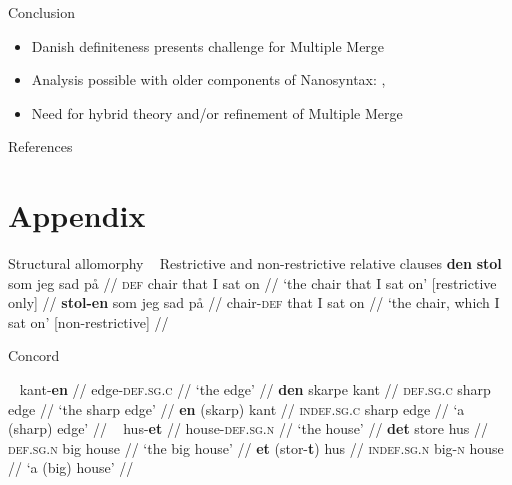 \documentclass[aspectratio=149]{beamer}
\begin{document}
\begin{frame}{Conclusion}
\begin{itemize}
\item Danish definiteness presents challenge for Multiple Merge
\item Analysis possible with older components of Nanosyntax: \citet{taraldsen2010nanosyntax}, \citet{starke2018complex}
\item Need for hybrid theory and/or refinement of Multiple Merge
\end{itemize}
\end{frame}

\begin{frame}{References}
\nocite{caha2019fine}
\nocite{hankamer2018structure}
\printbibliography[heading=none]
\end{frame}

\appendix

\section{Appendix}


\begin{frame}{Structural allomorphy {\hfill\footnotesize\citep{hankamer2018structure}}}
\pex~ Restrictive and non-restrictive relative clauses
\a
\begingl
\gla \textbf{den} \textbf{stol} som jeg sad p\r{a} //
\glb \textsc{def} chair that I sat on //
\glft `the chair that I sat on' [restrictive only] //
\endgl
\a
\begingl
\gla \textbf{stol-en} som jeg sad p\r{a} //
\glb chair-\textsc{def} that I sat on //
\glft `the chair, which I sat on' [non-restrictive] //
\endgl
\xe

\end{frame}
\begin{frame}{Concord}
\begin{multicols}{2}
\small
\pex~
\a
\begingl
\gla kant-\textbf{en} //
\glb edge-\textsc{def.sg.c} //
\glft `the edge' //
\endgl
\a
\begingl
\gla \textbf{den} skarpe kant //
\glb \textsc{def.sg.c} sharp edge //
\glft `the sharp edge' //
\endgl
\a
\begingl
\gla \textbf{en} (skarp) kant //
\glb \textsc{indef.sg.c} sharp edge //
\glft `a (sharp) edge' //
\endgl \label{ex:en-skarp-kant}
\xe
\pex~
\a
\begingl
\gla hus-\textbf{et} //
\glb house-\textsc{def.sg.n} //
\glft `the house' //
\endgl %
\a
\begingl
\gla \textbf{det} store hus //
\glb \textsc{def.sg.n} big house //
\glft `the big house' //
\endgl %
\a
\begingl
\gla \textbf{et} (stor-\textbf{t}) hus //
\glb \textsc{indef.sg.n} big-\textsc{n} house //
\glft `a (big) house' //
\endgl \label{ex:et-stort-hus}
\xe
\end{multicols}
\end{frame}
\end{document}
